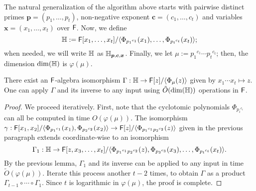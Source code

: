   The natural
generalization of the algorithm above starts with pairwise distinct
primes $\boldsymbol{p}=(p_1,\dots,p_t)$, non-negative exponent
$\boldsymbol{c}=(c_1,\dots,c_t)$ and variables
$\boldsymbol{x}=(x_1,\dots,x_t)$ over ${\mathsf{F}}$. Now, we define
$$\mathbb{H}:={\mathsf{F}}[x_1,\dots,x_t]/\langle
\Phi_{{p_1}^{c_1}}(x_1),\dots,\Phi_{{p_t}^{c_t}}(x_t)\rangle;$$ when
needed, we will write $\mathbb{H}$ as
$\mathbb{H}_{\boldsymbol{p},\boldsymbol{c},\boldsymbol{x}}$. Finally, we let
$\mu:={p_1}^{c_1}\cdots {p_t}^{c_t}$; then, the dimension $\dim(\mathbb{H})$ is
$\varphi(\mu)$.

\begin{lemma}\label{lemma:distinctP}
 There exist an ${\mathsf{F}}$-algebra isomorphism $\Gamma: \mathbb{H} \to
 {\mathsf{F}}[z]/\langle\Phi_{\mu}(z)\rangle$ given by $x_1 \cdots x_t \mapsto
 z$.  One can apply $\Gamma$ and its inverse to any input using
 $\tilde{O}(\dim(\mathbb{H}))$ operations in ${\mathsf{F}}$.
\end{lemma}
\begin{proof}
  We proceed iteratively. First, note that the cyclotomic polynomials
  $\Phi_{{p_i}^{c_i}}$ can all be computed in time $O(\varphi(\mu))$. 
  The isomorphism
  $\gamma: {\mathsf{F}}[x_1,x_2]/\langle \Phi_{{p_1}^{c_1}}(x_1),
  \Phi_{{p_2}^{c_2}}(x_2)\rangle \to {\mathsf{F}}[z]/\langle
  \Phi_{{p_1}^{c_1}{p_2}^{c_2}}(z)\rangle$
given in the previous paragraph extends coordinate-wise to an
  isomorphism
  $$\Gamma_1: \mathbb{H} \to {\mathsf{F}}[z,x_3,\dots,x_t]/\langle
  \Phi_{{p_1}^{c_1}{p_2}^{c_2}}(z),\Phi_{{p_3}^{c_3}}(x_3),\dots,\Phi_{{p_t}^{c_t}}(x_t)\rangle.$$
  By the previous lemma, $\Gamma_1$ and its inverse can be applied to
  any input in time $\tilde{O}(\varphi(\mu))$. Iterate this process
  another $t-2$ times, to obtain $\Gamma$ as a product
  $\Gamma_{t-1} \circ \cdots \circ \Gamma_1$. Since $t$ is logarithmic 
  in $\varphi(\mu)$, the proof is complete.
\end{proof}

